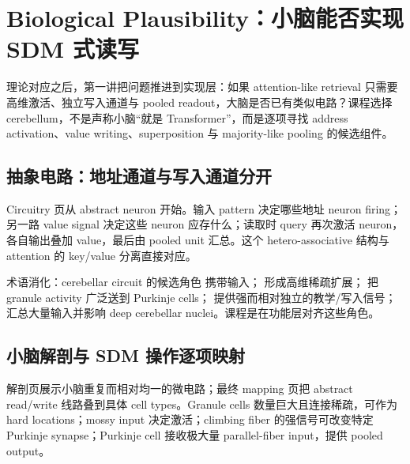 \section{Biological Plausibility：小脑能否实现 SDM 式读写}

理论对应之后，第一讲把问题推进到实现层：如果 attention-like retrieval 只需要高维激活、独立写入通道与 pooled readout，大脑是否已有类似电路？课程选择 cerebellum，不是声称小脑“就是 Transformer”，而是逐项寻找 address activation、value writing、superposition 与 majority-like pooling 的候选组件。

\subsection{抽象电路：地址通道与写入通道分开}

Circuitry 页从 abstract neuron 开始。输入 pattern 决定哪些地址 neuron firing；另一路 value signal 决定这些 neuron 应存什么；读取时 query 再次激活 neuron，各自输出叠加 value，最后由 pooled unit 汇总。这个 hetero-associative 结构与 attention 的 key/value 分离直接对应。



\begin{knowledgebox}{术语消化：cerebellar circuit 的候选角色}
 携带输入； 形成高维稀疏扩展； 把 granule activity 广泛送到 Purkinje cells； 提供强而相对独立的教学/写入信号； 汇总大量输入并影响 deep cerebellar nuclei。课程是在功能层对齐这些角色。
\end{knowledgebox}

\subsection{小脑解剖与 SDM 操作逐项映射}

解剖页展示小脑重复而相对均一的微电路；最终 mapping 页把 abstract read/write 线路叠到具体 cell types。Granule cells 数量巨大且连接稀疏，可作为 hard locations；mossy input 决定激活；climbing fiber 的强信号可改变特定 Purkinje synapse；Purkinje cell 接收极大量 parallel-fiber input，提供 pooled output。



